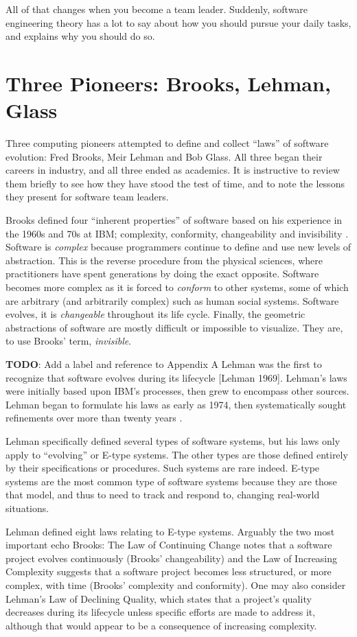 All of that changes when you become a team leader. Suddenly, software engineering theory has a lot to say about how you should pursue your daily tasks, and explains why you should do so.

\section{Three Pioneers: Brooks, Lehman, Glass}

Three computing pioneers attempted to define and collect ``laws'' of software evolution: Fred Brooks, Meir Lehman and Bob Glass. All three began their careers in industry, and all three ended as academics. It is instructive to review them briefly to see how they have stood the test of time, and to note the lessons they present for software team leaders.

Brooks defined four ``inherent properties'' of software based on his experience in the 1960s and 70s at IBM; complexity, conformity, changeability and invisibility \cite{Brooks-1987}. Software is \textit{complex} because programmers continue to define and use new levels of abstraction. This is the reverse procedure from the physical sciences, where practitioners have spent generations by doing the exact opposite. Software becomes more complex as it is forced to \textit{conform} to other systems, some of which are arbitrary (and arbitrarily complex) such as human social systems. Software evolves, it is \textit{changeable} throughout its life cycle. Finally, the geometric abstractions of software are mostly difficult or impossible to visualize. They are, to use Brooks' term, \textit{invisible}.

\textbf{TODO}: Add a label and reference to Appendix A
Lehman was the first to recognize that software evolves during its lifecycle [Lehman 1969]. Lehman's laws were initially based upon IBM's processes, then grew to encompass other sources. Lehman began to formulate his laws as early as 1974, then systematically sought refinements over more than twenty years \cite{Lehman-1997}.

Lehman specifically defined several types of software systems, but his laws only apply to ``evolving'' or E-type systems. The other types are those defined entirely by their specifications or procedures. Such systems are rare indeed. E-type systems are the most common type of software systems because they are those that model, and thus to need to track and respond to, changing real-world situations.

Lehman defined eight laws relating to E-type systems. Arguably the two most important echo Brooks: The Law of Continuing Change notes that a software project evolves continuously (Brooks' changeability) and the Law of Increasing Complexity suggests that a software project becomes less structured, or more complex, with time (Brooks' complexity and conformity). One may also consider Lehman's Law of Declining Quality, which states that a project's quality decreases during its lifecycle unless specific efforts are made to address it, although that would appear to be a consequence of increasing complexity.

